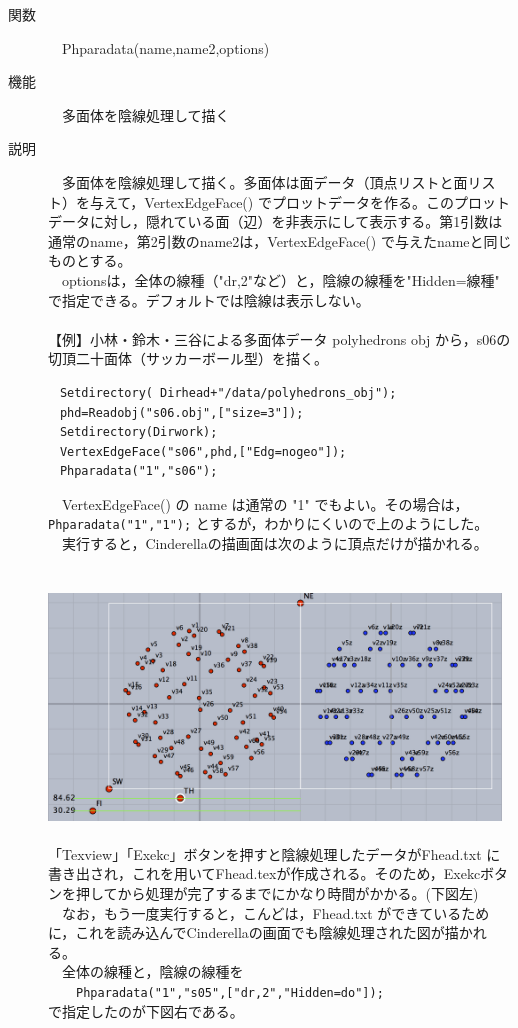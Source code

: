 \documentclass[papersize,a4paper,12pt,uplatex]{jsarticle}
\begin{document}
\begin{description}
\hypertarget{phparadata}{}
\item[関数]　Phparadata(name,name2,options)
\item[機能]　多面体を陰線処理して描く
\item[説明]　多面体を陰線処理して描く。多面体は面データ（頂点リストと面リスト）を与えて，VertexEdgeFace() でプロットデータを作る。このプロットデータに対し，隠れている面（辺）を非表示にして表示する。第1引数は通常のname，第2引数のname2は，VertexEdgeFace() で与えたnameと同じものとする。\\
　optionsは，全体の線種（"dr,2"など）と，陰線の線種を"Hidden=線種" で指定できる。デフォルトでは陰線は表示しない。\\
　\\
【例】小林・鈴木・三谷による多面体データ  polyhedrons obj  から，s06の切頂二十面体（サッカーボール型）を描く。
\begin{verbatim}
　Setdirectory( Dirhead+"/data/polyhedrons_obj");
　phd=Readobj("s06.obj",["size=3"]);
　Setdirectory(Dirwork);
　VertexEdgeFace("s06",phd,["Edg=nogeo"]);
　Phparadata("1","s06");
\end{verbatim}
　VertexEdgeFace() の name は通常の "1" でもよい。その場合は，\verb|Phparadata("1","1");| とするが，わかりにくいので上のようにした。\\
　実行すると，Cinderellaの描画面は次のように頂点だけが描かれる。\\
　\\
　\includegraphics[bb=0 0 1452 730 , width=12cm]{Fig3d/phparadata01.png}\\
　\\
「Texview」「Exekc」ボタンを押すと陰線処理したデータがFhead.txt に書き出され，これを用いてFhead.texが作成される。そのため，Exekcボタンを押してから処理が完了するまでにかなり時間がかかる。(下図左)\\
　なお，もう一度実行すると，こんどは，Fhead.txt ができているために，これを読み込んでCinderellaの画面でも陰線処理された図が描かれる。\\
　全体の線種と，陰線の線種を\\
　　\verb|Phparadata("1","s05",["dr,2","Hidden=do"]);|\\
で指定したのが下図右である。\\


\end{description}
\end{document}
